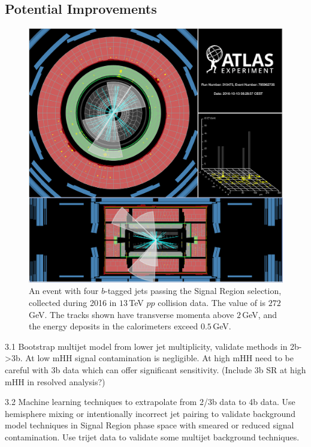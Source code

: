 \subsection{Potential Improvements}
\label{sec:improvements4b}

\begin{figure}
  \begin{center}
    \includegraphics[width=\linewidth]{figures/HH4b/272GeV.pdf}
    \caption{An event with four $b$-tagged jets passing the Signal Region selection,
      collected during 2016 in $13\,$TeV $pp$ collision data. The value of \mhh is $272\,$GeV.
      The tracks shown have transverse momenta above $2\,$GeV, and the energy deposits in the calorimeters exceed $0.5\,$GeV.}
    \label{fig:eventDisplay4b}
  \end{center}
\end{figure}

3.1 Bootstrap multijet model from lower jet multiplicity, validate methods in 2b->3b. At low mHH signal contamination is negligible. At high mHH need to be careful with 3b data which can offer significant sensitivity. (Include 3b SR at high mHH in resolved analysis?)

3.2 Machine learning techniques to extrapolate from 2/3b data to 4b data. Use hemisphere mixing or intentionally incorrect jet pairing to validate background model techniques in Signal Region phase space with smeared or reduced signal contamination. Use trijet data to validate some multijet background techniques. 

